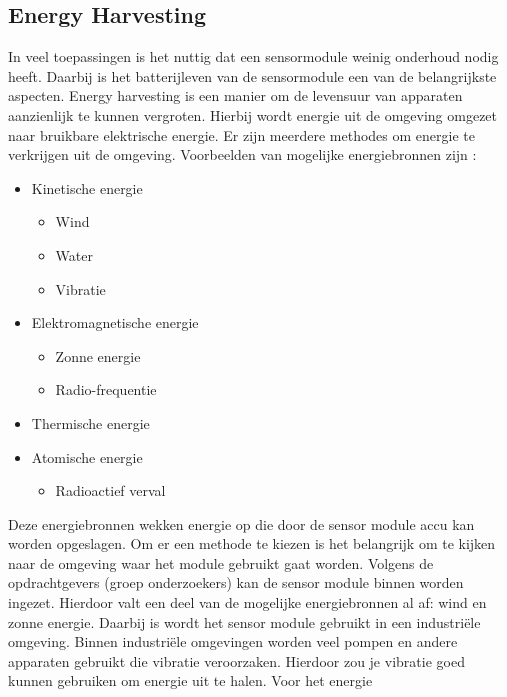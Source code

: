 \subsection{Energy Harvesting}
In veel toepassingen is het nuttig dat een sensormodule weinig onderhoud nodig heeft. Daarbij is het batterijleven van de sensormodule een van de belangrijkste aspecten. Energy harvesting is een manier om de levensuur van apparaten aanzienlijk te kunnen vergroten. Hierbij wordt energie uit de omgeving omgezet naar bruikbare elektrische energie. Er zijn meerdere methodes om energie te verkrijgen uit de omgeving. Voorbeelden van mogelijke energiebronnen zijn \cite{energyHarvesting}:
\begin{itemize}
    \item Kinetische energie
    \begin{itemize}
        \item Wind
        \item Water
        \item Vibratie
    \end{itemize}
    \item Elektromagnetische energie
    \begin{itemize}
        \item Zonne energie
        \item Radio-frequentie
    \end{itemize}
    \item Thermische energie
    \item Atomische energie
    \begin{itemize}
        \item Radioactief verval
    \end{itemize}
\end{itemize} 

Deze energiebronnen wekken energie op die door de sensor module accu kan worden opgeslagen. Om er een methode te kiezen is het belangrijk om te kijken naar de omgeving waar het module gebruikt gaat worden. Volgens de opdrachtgevers (groep onderzoekers) kan de sensor module binnen worden ingezet. Hierdoor valt een deel van de mogelijke energiebronnen al af: wind en zonne energie. Daarbij is wordt het sensor module gebruikt in een industriële omgeving. Binnen industriële omgevingen worden veel pompen en andere apparaten gebruikt die vibratie veroorzaken. Hierdoor zou je vibratie goed kunnen gebruiken om energie uit te halen. Voor het energie 


